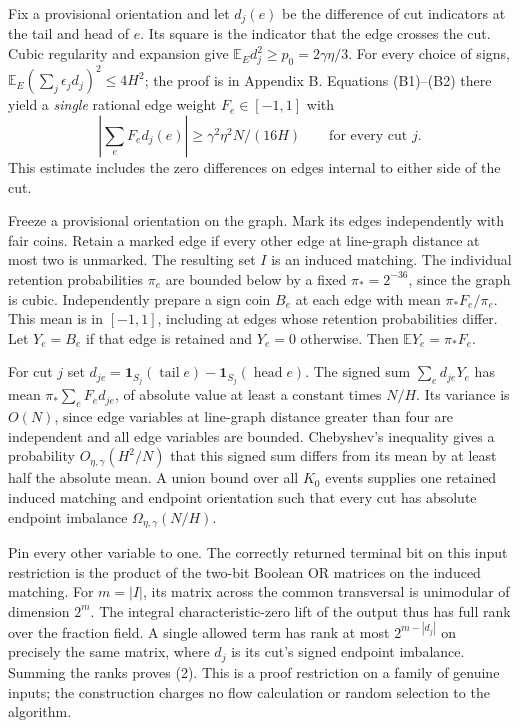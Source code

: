 \documentclass[
  11pt,
]{article}
\begin{document}
Fix a provisional orientation and let \(d_j(e)\) be the difference of
cut indicators at the tail and head of \(e\). Its square is the indicator
that the edge crosses the cut. Cubic regularity and expansion give
\(\mathbb E_E d_j^2\ge p_0=2\gamma\eta/3\). For every choice of signs,
\(\mathbb E_E(\sum_j\epsilon_jd_j)^2\le4H^2\); the proof is in
Appendix B. Equations (B1)--(B2) there yield a \emph{single} rational
edge weight \(F_e\in[-1,1]\) with
\[
       \left|\sum_e F_e d_j(e)\right|
       \ge \gamma^2\eta^2 N/(16H)
       \qquad\text{for every cut }j .
\]
This estimate includes the zero differences on edges internal to either side of the cut.

Freeze a provisional orientation on the graph. Mark its edges
independently with fair coins. Retain a marked edge if every other edge
at line-graph distance at most two is unmarked. The resulting set \(I\)
is an induced matching. The individual retention probabilities \(\pi_e\)
are bounded below by a fixed \(\pi_*=2^{-36}\), since the graph is cubic.
Independently prepare a sign coin \(B_e\) at each edge with mean
\(\pi_*F_e/\pi_e\). This mean is in \([-1,1]\), including at edges whose
retention probabilities differ. Let \(Y_e=B_e\) if that edge is retained
and \(Y_e=0\) otherwise. Then \(\mathbb E Y_e=\pi_*F_e\).

For cut \(j\) set
\(d_{je}=\mathbf1_{S_j}(\operatorname{tail}e)-\mathbf1_{S_j}(\operatorname{head}e)\).
The signed sum \(\sum_e d_{je}Y_e\) has mean
\(\pi_*\sum_e F_e d_{je}\), of absolute value at least a constant
times \(N/H\). Its variance is \(O(N)\), since edge variables at
line-graph distance greater than four are independent and all edge
variables are bounded. Chebyshev's inequality gives a probability
\(O_{\eta,\gamma}(H^2/N)\) that this signed sum differs from its mean by
at least half the absolute mean. A union bound over all \(K_0\) events
supplies one retained induced matching and endpoint orientation such
that every cut has absolute endpoint imbalance
\(\Omega_{\eta,\gamma}(N/H)\).

Pin every other variable to one. The correctly returned terminal bit on
this input restriction is the product of the two-bit Boolean OR matrices
on the induced matching. For \(m=|I|\), its matrix across the common
transversal is unimodular of dimension \(2^m\). The integral
characteristic-zero lift of the output thus has full rank over the
fraction field. A single allowed term has rank at most \(2^{m-|d_j|}\)
on precisely the same matrix, where \(d_j\) is its cut's signed endpoint
imbalance. Summing the ranks proves (2). This is a proof restriction on
a family of genuine inputs; the construction charges no flow calculation
or random selection to the algorithm.
\end{document}

